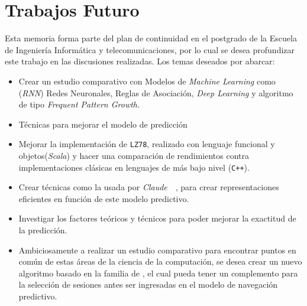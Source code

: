 \newpage
\section{Trabajos Futuro}

Esta memoria forma parte del plan de continuidad en el postgrado de la Escuela de Ingeniería Informática y telecomunicaciones, por lo cual se desea profundizar este trabajo en las discusiones realizadas. Los temas deseados por abarcar:

\begin{itemize}

\item Crear un estudio comparativo con Modelos de \emph{Machine Learning} como (\emph{RNN}) Redes Neuronales, Reglas de Asociación, \emph{Deep Learning} y algoritmo de tipo \emph{Frequent Pattern Growth}.

\item Técnicas para mejorar el modelo de predicción 
\item Mejorar la implementación de \texttt{LZ78}, realizado con lenguaje funcional y objetos(\emph{Scala}) y hacer una comparación de rendimientos contra implementaciones clásicas en lenguajes de más bajo nivel (\texttt{C++}).


\item Crear técnicas como la usada por \emph{Claude}~\etal~\cite{Claude2014}, para crear representaciones eficientes en función de este modelo predictivo.


\item Investigar los factores teóricos y técnicos para poder mejorar la exactitud de la predicción.

\item Ambiciosamente a realizar un estudio comparativo para encontrar puntos en común de estas áreas de la ciencia de la computación, se desea crear un nuevo algoritmo basado en la familia de \lempelziv, el cual pueda tener un complemento para la selección de sesiones antes ser ingresadas en el modelo de navegación predictivo. 


	
\end{itemize}	

